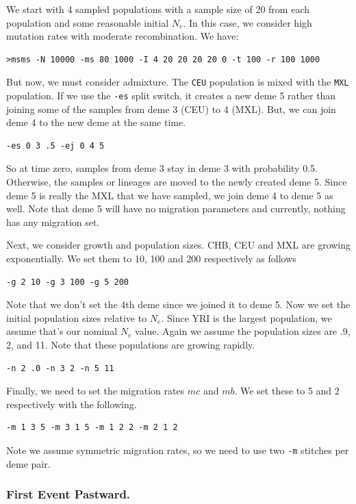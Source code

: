 \documentclass{article}
\begin{document}
We start with 4 sampled populations with a sample size of 20 from each
population and some reasonable initial $N_e$. In this case, we consider high mutation rates with
moderate recombination. We have:
\begin{verbatim}
>msms -N 10000 -ms 80 1000 -I 4 20 20 20 20 0 -t 100 -r 100 1000 
\end{verbatim}
But now, we must consider admixture. The {\tt CEU} population is mixed with the
{\tt MXL} population. If we use the {\tt -es} split switch, it creates a new
deme 5 rather than joining some of the samples from deme 3 (CEU) to 4 (MXL). But,
we can join deme 4 to the new deme at the same time.
\begin{verbatim}
-es 0 3 .5 -ej 0 4 5
\end{verbatim}
So at time zero, samples from deme 3 stay in deme 3 with probability 0.5.
Otherwise, the samples or lineages are moved to the newly created deme 5. Since
deme 5 is really the MXL that we have sampled, we join deme 4 to deme 5 as well.
Note that deme 5 will have no migration parameters and currently, nothing has any
migration set. 

Next, we consider growth and population sizes. CHB, CEU and MXL are growing
exponentially. We set them to 10, 100 and 200 respectively as follows
\begin{verbatim}
-g 2 10 -g 3 100 -g 5 200
\end{verbatim}
Note that we don't set the 4th deme since we joined it to deme 5. Now we set
the initial population sizes relative to $N_e$. Since YRI is the largest
population, we assume that's our nominal $N_e$ value. Again we assume the
population sizes are .9, 2, and 11. Note that these populations are growing
rapidly.
\begin{verbatim}
-n 2 .0 -n 3 2 -n 5 11
\end{verbatim}

Finally, we need to set the migration rates $mc$ and $mb$. We set these to 5 and
2 respectively with the following.
\begin{verbatim}
-m 1 3 5 -m 3 1 5 -m 1 2 2 -m 2 1 2
\end{verbatim}
Note we assume symmetric migration rates, so we need to use two {\tt -m} stitches
per deme pair. 
\subsubsection*{First Event Pastward.}
\end{document}

